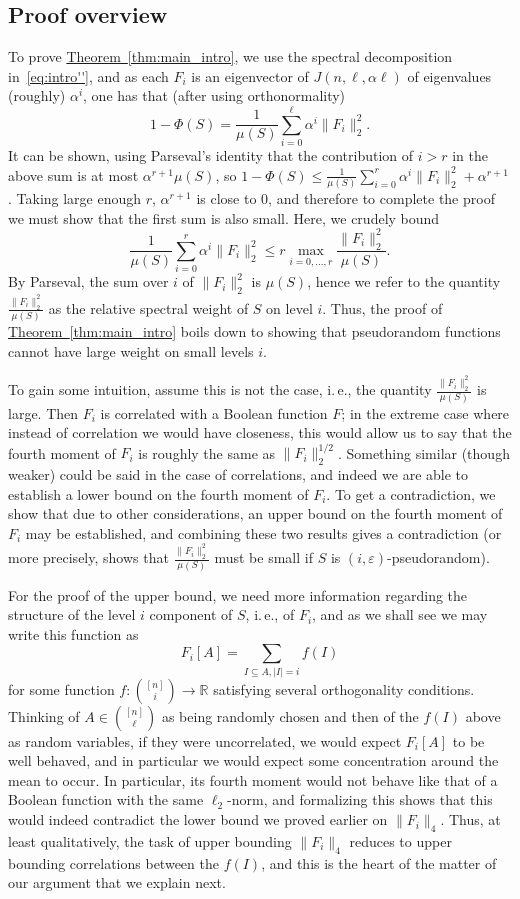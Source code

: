 \documentclass[11pt]{article}
\newcommand{\expref}[2]{\texorpdfstring{\hyperref[#2]{#1~\ref{#2}}}{#1~\ref{#2}}}
\newcommand{\ie}{i.\,e.}
\newcommand\card[1]{\left| {#1} \right|}
\newcommand\norm[1]{\| #1 \|}
\newcommand\eps{\varepsilon}
\renewcommand\leq{\leqslant}
\begin{document}
\subsection{Proof overview}
To prove \expref{Theorem}{thm:main_intro}, we use the spectral decomposition
in~\eqref{eq:intro''}, and as each $F_{i}$ is an eigenvector of $J(n,\ell,\alpha\ell)$
of eigenvalues (roughly) $\alpha^i$, one has that (after using orthonormality)
\[
1-\Phi(S) = \frac{1}{\mu(S)}\sum\limits_{i=0}^{\ell} \alpha^i\norm{F_{i}}_2^2.
\]
It can be shown, using Parseval's identity that the contribution of $i>r$ in the above sum is at most $\alpha^{r+1} \mu(S)$,
so $1-\Phi(S) \leq \frac{1}{\mu(S)}\sum\limits_{i=0}^{r} \alpha^i\norm{F_{i}}_2^2 + \alpha^{r+1}$. Taking large enough $r$,
$\alpha^{r+1}$ is close to $0$, and therefore to complete the proof we must show that the first sum is also small. Here,
we crudely bound
\[
\frac{1}{\mu(S)}\sum\limits_{i=0}^{r} \alpha^i\norm{F_{i}}_2^2
\leq r\max_{i=0,\ldots,r}\frac{\norm{F_{i}}_2^2}{\mu(S)}.
\]
By Parseval, the sum over $i$ of $\norm{F_{i}}_2^2$ is $\mu(S)$, hence we refer to the quantity $\frac{\norm{F_{i}}_2^2}{\mu(S)}$
as the relative spectral weight of $S$ on level $i$. Thus, the proof of \expref{Theorem}{thm:main_intro} boils down to showing that pseudorandom
functions cannot have large weight on small levels $i$.

To gain some intuition, assume this is not the case, %
\ie, the quantity $\frac{\norm{F_{i}}_2^2}{\mu(S)}$
is large. Then $F_{i}$ is correlated with a Boolean function $F$; in the extreme case where instead of correlation we would have closeness, this would allow
us to say that the fourth moment of $F_i$ is roughly the same as $\norm{F_i}_2^{1/2}$. Something similar (though weaker) could be said in the case of correlations,
and indeed we are able to establish a lower bound on the fourth moment of $F_i$. To get a contradiction, we show that due to other considerations, an upper bound
on the fourth moment of $F_i$ may be established, and combining these two results gives a contradiction (or more precisely, shows that $\frac{\norm{F_{i}}_2^2}{\mu(S)}$
must be small if $S$ is $(i,\eps)$-pseudorandom).

For the proof of the upper bound, we need more information regarding the structure of the level $i$
component of $S$, \ie, of $F_{i}$, and as we shall see we may write this function as
\[
F_i[A] = \sum\limits_{I\subseteq A, \card{I} = i}f(I)
\]
for some function $f\colon \binom{[n]}{i}\to\mathbb{R}$ satisfying several orthogonality conditions. Thinking of $A\in\binom{[n]}{\ell}$ as being randomly chosen and %
then of the %
%
$f(I)$   %
above as random variables, if they were uncorrelated, we would expect $F_i[A]$ to be well behaved, and in particular we would
expect some concentration around the mean to occur. In particular, its fourth moment would not behave like that of a Boolean function with the same $\ell_2$-norm,
and formalizing this shows that this would indeed contradict the lower bound we proved earlier on $\norm{F_i}_4$. Thus, at least qualitatively, the
task of upper bounding $\norm{F_i}_4$ reduces to upper bounding correlations between
the %
$f(I)$,  %
and this is the heart of the matter of our argument that we explain next.
\end{document}
